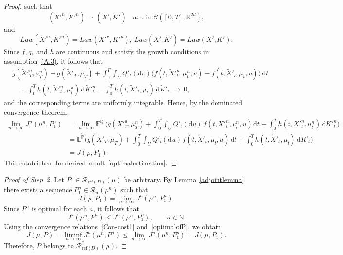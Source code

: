 \documentclass[11pt,amsfonts]{article}
\theoremstyle{plain}
\theoremstyle{assumpstyle}
\numberwithin{equation}{section}
\numberwithin{theorem}{section}
\numberwithin{proposition}{section}
\numberwithin{definition}{section}
\numberwithin{remark}{section}
\numberwithin{corollary}{section}
\numberwithin{lemma}{section}
\begin{document}
\begin{proof}
such that
\begin{equation*}
(\tilde{X}'^n, \tilde{K}'^n)
\to
(\tilde{X}', \tilde{K}')
\quad 
\text{a.s. in } 
\mathcal{C}([0,T]; \mathbb{R}^{2d}),
\end{equation*}
and
\begin{equation*}
Law(\tilde{X}'^n, \tilde{K}'^n)
= 
Law(X'^n, K'^n),
\ 
Law(\tilde{X}', \tilde{K}')
= 
Law(X', K').
\end{equation*}
Since $ f, g, $ and $ h $ are continuous and satisfy the growth conditions in assumption~\hyperlink{A.3}{(A.3)}, 
it follows that
\begin{align*}
& g(\tilde{X}'^n_T, \mu^n_T) - g(\tilde{X}'_T, \mu_T)
+ 
\int_0^T\int_U 
Q'_t(\mathrm{d}u)
\big(f(t, \tilde{X}'^n_t, \mu^n_t, u)
    - f(t, \tilde{X}'_t, \mu_t, u)\big)\,\mathrm{d}t
\\
&\quad 
+ 
\int_0^T 
h(t, \tilde{X}'^n_t, \mu^n_t)\,\mathrm{d}\tilde{K}'^n_t
- 
\int_0^T 
h(t, \tilde{X}'_t, \mu_t)\,\mathrm{d}\tilde{K}'_t
\;\longrightarrow\; 0,
\end{align*}
and the corresponding terms are uniformly integrable. 
Hence, by the dominated convergence theorem,
\begin{align*}
\lim_{n \to \infty} J^n(\mu^n, P^n_1)
&= 
\lim_{n \to \infty}
\mathbb{E}^{\mathbb{Q}'}
\Bigg(
g(X'^n_T, \mu^n_T)
+ 
\int_0^T\int_U 
Q'_t(\mathrm{d}u)\,
f(t, X'^n_t, \mu^n_t, u)\,\mathrm{d}t
+ 
\int_0^T 
h(t, X'^n_t, \mu^n_t)\,
\mathrm{d}K'^n_t
\Bigg)
\\[3pt]
&= 
\mathbb{E}^{\tilde{\mathbb{P}}}
\Bigg(
g(\tilde{X}'_T, \mu_T)
+ 
\int_0^T \int_U 
Q'_t(\mathrm{d}u)\,
f(t, \tilde{X}'_t, \mu_t, u)\,\mathrm{d}t
+ 
\int_0^T 
h(t, \tilde{X}'_t, \mu_t)\,
\mathrm{d}\tilde{K}'_t
\Bigg)
\\[3pt]
&= 
J(\mu, P_1).
\end{align*}
This establishes the desired result~\eqref{optimalestimation}.
\end{proof}

\begin{proof}[Proof of Step~2]
Let $ P_1 \in \mathcal{R}_{\mathrm{ref}(D)}(\mu) $ be arbitrary. 
By Lemma~\ref{adjointlemma}, there exists a sequence 
$ P_1^n \in \mathcal{R}_n(\mu^n) $ such that
\begin{equation}\label{optimalofP}
J(\mu, P_1) = \lim_{n \to \infty} J^n(\mu^n, P_1^n).
\end{equation}
Since $ P^n $ is optimal for each $n$, it follows that
\begin{equation*}
J^n(\mu^n, P^n) \le J^n(\mu^n, P_1^n),
\qquad n \in \mathbb{N}.
\end{equation*}
Using the convergence relations~\eqref{Con-cost1} and~\eqref{optimalofP}, we obtain
\begin{equation*}
J(\mu, P)
= 
\liminf_{n \to \infty} J^n(\mu^n, P^n)
\le 
\lim_{n \to \infty} J^n(\mu^n, P_1^n)
= 
J(\mu, P_1).
\end{equation*}
Therefore, $P$ belongs to $\mathcal{R}^{*}_{\mathrm{ref}(D)}(\mu)$.
\end{proof}
\end{document}
